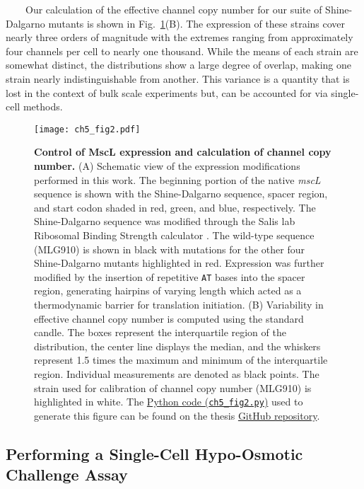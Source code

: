 \documentclass[12pt]{caltech_thesis}
\begin{document}
~~~~Our calculation of the effective channel copy number for our suite
of Shine-Dalgarno mutants is shown in Fig.~\ref{fig:mscl_boxplot}(B).
The expression of these strains cover nearly three orders of magnitude
with the extremes ranging from approximately four channels per cell to
nearly one thousand. While the means of each strain are somewhat
distinct, the distributions show a large degree of overlap, making one
strain nearly indistinguishable from another. This variance is a
quantity that is lost in the context of bulk scale experiments but, can
be accounted for via single-cell methods.

\hypertarget{fig:mscl_boxplot}{%
\begin{figure}
\centering
\texttt{[image: ch5\_fig2.pdf]}
\caption[{Control of MscL expression and calculation of channel copy
number.}]{\textbf{Control of MscL expression and calculation of channel
copy number.} (A) Schematic view of the expression modifications
performed in this work. The beginning portion of the native \emph{mscL}
sequence is shown with the Shine-Dalgarno sequence, spacer region, and
start codon shaded in red, green, and blue, respectively. The
Shine-Dalgarno sequence was modified through the Salis lab Ribosomal
Binding Strength calculator \autocite{espahborujeni2014,salis2009a}. The
wild-type sequence (MLG910) is shown in black with mutations for the
other four Shine-Dalgarno mutants highlighted in red. Expression was
further modified by the insertion of repetitive \texttt{AT} bases into
the spacer region, generating hairpins of varying length which acted as
a thermodynamic barrier for translation initiation. (B) Variability in
effective channel copy number is computed using the standard candle. The
boxes represent the interquartile region of the distribution, the center
line displays the median, and the whiskers represent 1.5 times the
maximum and minimum of the interquartile region. Individual measurements
are denoted as black points. The strain used for calibration of channel
copy number (MLG910) is highlighted in white. The
\href{https://github.com/gchure/phd/blob/master/src/chapter_05/code/ch5_fig2.py}{Python
code (\texttt{ch5\_fig2.py})} used to generate this figure can be found
on the thesis \href{https://github.com/gchure/phd}{GitHub repository}.}
\label{fig:mscl_boxplot}
\end{figure}
}

\hypertarget{performing-a-single-cell-hypo-osmotic-challenge-assay}{%
\subsection{Performing a Single-Cell Hypo-Osmotic Challenge
Assay}\label{performing-a-single-cell-hypo-osmotic-challenge-assay}}
\end{document}
